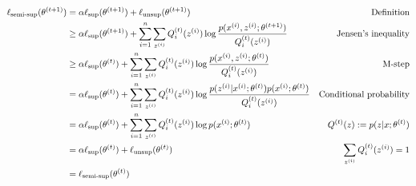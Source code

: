 \begin{answer}
\begin{align*}
\ell_\text{semi-sup}(\theta^{(t+1)})
&= \alpha \ell_\text{sup}(\theta^{(t+1)}) + \ell_\text{unsup}(\theta^{(t+1)})
    &\text{Definition} \\
&\ge \alpha \ell_\text{sup}(\theta^{(t+1)}) + \sum_{i=1}^{n}\sum_{z^{(i)}}Q_i^{(t)}(z^{(i)})\log\frac{p(x^{(i)},z^{(i)};\theta^{(t+1)})}{Q_i^{(t)}(z^{(i)})}
    &\text{Jensen's inequality} \\
&\ge \alpha \ell_\text{sup}(\theta^{(t)}) + \sum_{i=1}^{n}\sum_{z^{(i)}}Q_i^{(t)}(z^{(i)})\log\frac{p(x^{(i)},z^{(i)};\theta^{(t)})}{Q_i^{(t)}(z^{(i)})}
    &\text{M-step} \\
&= \alpha \ell_\text{sup}(\theta^{(t)}) + \sum_{i=1}^{n}\sum_{z^{(i)}}Q_i^{(t)}(z^{(i)})\log\frac{p(z^{(i)}|x^{(i)};\theta^{(t)})p(x^{(i)};\theta^{(t)})}{Q_i^{(t)}(z^{(i)})}
	&\text{Conditional probability} \\
&= \alpha \ell_\text{sup}(\theta^{(t)}) + \sum_{i=1}^{n}\sum_{z^{(i)}}Q_i^{(t)}(z^{(i)})\log p(x^{(i)};\theta^{(t)})
	&{Q^{(t)}(z) := p(z|x;\theta^{(t)})} \\
&= \alpha \ell_\text{sup}(\theta^{(t)}) + \ell_\text{unsup}(\theta^{(t)})
    &\sum_{z^{(i)}}Q_i^{(t)}(z^{(i)})=1\\
&= \ell_\text{semi-sup}(\theta^{(t)})
\end{align*}
\end{answer}
